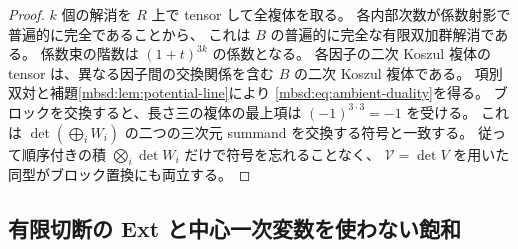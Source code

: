 \begin{proof}
$k$ 個の解消を $R$ 上で tensor して全複体を取る。
各内部次数が係数射影で普遍的に完全であることから、
これは $B$ の普遍的に完全な有限双加群解消である。
係数束の階数は $(1+t)^{3k}$ の係数となる。
各因子の二次 Koszul 複体の tensor は、異なる因子間の交換関係を含む
$B$ の二次 Koszul 複体である。
項別双対と補題\ref{mbsd:lem:potential-line}により
\eqref{mbsd:eq:ambient-duality}を得る。
ブロックを交換すると、長さ三の複体の最上項は $(-1)^{3\cdot3}=-1$ を受ける。
これは $\det(\bigoplus_iW_i)$ の二つの三次元 summand を交換する符号と一致する。
従って順序付きの積 $\bigotimes_i\det W_i$ だけで符号を忘れることなく、
$\mathscr V=\det V$ を用いた同型がブロック置換にも両立する。
\end{proof}

\subsection{有限切断の Ext と中心一次変数を使わない飽和}

